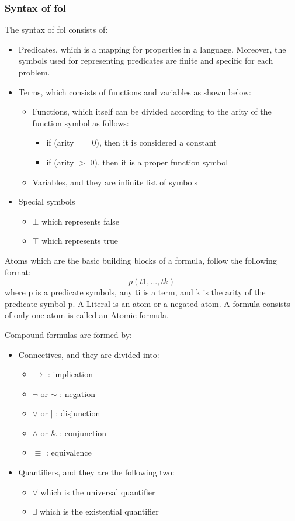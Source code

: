 \subsubsection{Syntax of \ac{fol}}
The syntax of \ac{fol} consists of:
	\begin{itemize}
		\item Predicates, which is a mapping for properties in a language. Moreover, the symbols used for representing predicates are finite and specific for each problem.
		\item Terms, which consists of functions and variables as shown below:		
			\begin{itemize}
				\item Functions, which itself can be divided according to the arity of the function symbol as follows:
					\begin{itemize}
						\item if (arity == 0), then it is considered a constant
						\item if (arity $>$ 0), then it is a proper function symbol 
					\end{itemize}
				\item Variables, and they are infinite list of symbols
			\end{itemize}
		\item Special symbols
			\begin{itemize}
				\item $\bot$ which represents false
				\item $\top$ which represents true
			\end{itemize}									
	\end{itemize}


Atoms which are the basic building blocks of a formula, follow the following format:
$$ p(t1,...,tk)$$ where p is a predicate symbols, any ti is a term, and k is the arity of the predicate symbol p. A Literal is an atom or a negated atom. A formula consists of only one atom is called an Atomic formula.

Compound formulas are formed by:
	\begin{itemize}
		\item Connectives, and they are divided into:
			\begin{itemize}
				\item $\rightarrow$ : implication
				\item $\neg$ or $\sim$ : negation
				\item $\vee$ or $\vert$ : disjunction
				\item $\wedge$ or $\&$ : conjunction
				\item $\equiv$ : equivalence
			\end{itemize}				
		\item Quantifiers, and they are the following two:
			\begin{itemize}
				\item $\forall$ which is the universal quantifier
				\item $\exists$ which is the existential quantifier
			\end{itemize}
	\end{itemize}


